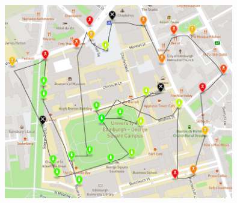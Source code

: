 \documentclass{article}
\begin{document}
\begin{center}
\includegraphics[width=0.75\textwidth]{05-05-2020-v2}
\end{center}




 

\end{document}
